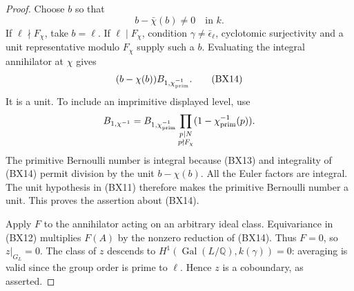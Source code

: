 \begin{proof}
Choose \(b\) so that
\[
                         b-\bar\chi(b)\ne0\quad\text{in }k .
 \tag{BX13}
\]
If \(\ell\nmid F_\chi\), take \(b=\ell\).
If \(\ell\mid F_\chi\), condition
\(\gamma\ne\bar\epsilon_\ell\), cyclotomic
surjectivity and a unit representative modulo \(F_\chi\)
supply such a \(b\).
Evaluating the integral annihilator at \(\chi\) gives
\[
           (b-\chi(b))B_{1,\chi_{\rm prim}^{-1}} .
 \tag{BX14}
\]
It is a unit.
To include an imprimitive displayed level, use
\[
 B_{1,\chi^{-1}}
   =B_{1,\chi_{\rm prim}^{-1}}
            \prod_{\substack{p\mid N\\p\nmid F_\chi}}
                                  (1-\chi_{\rm prim}^{-1}(p)).
\]
The primitive Bernoulli number is integral because
(BX13) and integrality of (BX14) permit division by
the unit \(b-\chi(b)\).
All the Euler factors are integral.
The unit hypothesis in (BX11) therefore makes the
primitive Bernoulli number a unit.
This proves the assertion about (BX14).

Apply \(F\) to the annihilator acting on an arbitrary
ideal class.
Equivariance in (BX12) multiplies \(F(A)\) by the
nonzero reduction of (BX14).
Thus \(F=0\), so \(z|_{G_L}=0\).
The class of \(z\) descends to
\(H^1(\operatorname{Gal}(L/\mathbb Q),k(\gamma))=0\):
averaging is valid since the group order is prime to
\(\ell\).
Hence \(z\) is a coboundary, as asserted.
\end{proof}

